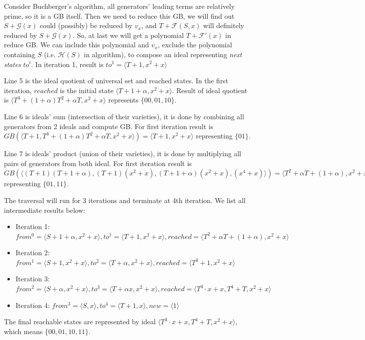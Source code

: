 \begin{Example}
Consider Buchberger's algorithm, all generators' leading terms are relatively prime, so it is a GB itself. 
Then we need to reduce this GB, we will find out $S + \mathcal G(x)$ could (possibly) be reduced by $v_x$,
and $T+\mathcal F(S,x)$ will definitely reduced by $S + \mathcal G(x)$. So, at last we will get a polynomial
$T + \mathcal F'(x)$ in reduce GB. We can include this polynomial and $v_x$, exclude the polynomial containing
$S$ (i.e. $\mathcal H(S)$ in algorithm), to compose an ideal representing \emph{next states} $to^i$. In iteration 1, result is $to^1 = \langle T+1, x^2+x\rangle$

Line 5 is the ideal quotient of universal set and reached states. In the first iteration, 
$reached$ is the initial state $\langle T+1+\alpha, x^2+x \rangle$. Result of ideal quotient
is $\langle T^3+(1+\alpha)T^2+\alpha T, x^2+x\rangle$ represents $\{00,01,10\}$.

Line 6 is ideals' sum (intersection of their varieties), it is done by combining all generators
from 2 ideals and compute GB. For first iteration result is $GB(\langle T+1,T^3+(1+\alpha)T^2+\alpha T, x^2+x\rangle) = \langle T+1, x^2+x\rangle$ representing $\{01\}$.

Line 7 is ideals' product (union of their varieties), it is done by multiplying all pairs of
generators from both ideal. For first iteration result is $GB(\langle (T+1)(T+1+\alpha),
(T+1)(x^2+x), (T+1+\alpha)(x^2+x), (x^4+x)\rangle) = \langle T^2+\alpha T+(1+\alpha), x^2+x\rangle$ representing $\{01,11\}$.

The traversal will run for 3 iterations and terminate at 4th iteration. We list all intermediate 
results below:
\begin{itemize}
\item Iteration 1: $from^0 = \langle S+1+\alpha, x^2+x\rangle, to^1 = \langle T+1, x^2+x\rangle,
 reached = \langle T^2+\alpha T+(1+\alpha), x^2+x\rangle$
\item Iteration 2: $from^1 = \langle S+1, x^2+x\rangle, to^2= \langle T+\alpha, x^2+x\rangle,
reached = \langle T^3+1, x^2+x\rangle$
\item Iteration 3: $from^2 = \langle S+\alpha, x^2+x\rangle, to^3 = \langle T+\alpha x, x^2+x
\rangle, reached = \langle T^3\cdot x+x, T^4+T, x^2+x\rangle$
\item Iteration 4: $from^3 = \langle S, x\rangle, to^4 = \langle T+1, x\rangle, new = \langle1\rangle$
\end{itemize}
The final reachable states are represented by ideal $\langle T^3\cdot x+x, T^4+T, x^2+x\rangle$,
which means $\{00,01,10,11\}$.
\end{Example}

